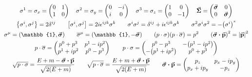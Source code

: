 \begin{gather*}
        \sigma^1 = \sigma_x = \begin{pmatrix}
                0 &1\\
                1 &0
        \end{pmatrix}
        \quad
        \sigma^2 = \sigma_y = \begin{pmatrix}
                0 &-i\\
                i &0
        \end{pmatrix}
        \quad
        \sigma^3 = \sigma_z = \begin{pmatrix}
                1 &0\\
                0 &-1
        \end{pmatrix}
        \quad
        \va*{\Sigma} = \begin{pmatrix}
                \va*{\sigma} &0\\
                0 &\va*{\sigma}\\
        \end{pmatrix}
        \\
        \acomm{\sigma^i}{\sigma^j} = 2\delta^{ij}
        \qquad
        \comm{\sigma^i}{\sigma^j} = 2i\epsilon^{ijk}\sigma^k
        \qquad
        \sigma^i\sigma^j = \delta^{ij} + i\epsilon^{ijk}\sigma^k
        \qquad
        \sigma^2\sigma^i\sigma^2 = -\qty(\sigma^i)^*
        \\
        \sigma^\mu=\qty(\mathbb{1},\va*{\sigma})
        \qquad
        \overline{\sigma}^\mu=\qty(\mathbb{1},-\va*{\sigma})
        \qquad
        \qty(p\cdot\sigma)\qty(p\cdot\overline{\sigma}) = p^2
        \qquad
        \qty(\va*{\sigma}\vdot\va{p})^2 = \abs{\va{p}}^2
        \\
        p\cdot\overline{\sigma} = \begin{pmatrix}
                p^0+p^3  &p^1-ip^2 \\
                p^1+ip^2 &p^0-p^3  \\
        \end{pmatrix}
        \qquad
        p\cdot\sigma = \begin{pmatrix}
                p^0 - p^3       &-\qty(p^1-ip^2) \\
                -\qty(p^1+ip^2) &p^0+p^3         \\
        \end{pmatrix}
        \\
        \sqrt{p\cdot\sigma} = \frac{E + m - \va*{\sigma}\vdot\va{p}}{\sqrt{2(E+m)}}
        \qquad
        \sqrt{p\cdot\overline{\sigma}} = \frac{E + m + \va*{\sigma}\vdot\va{p}}{\sqrt{2(E+m)}}
        \qquad
        \va*{\sigma}\vdot\va{p} = \begin{pmatrix}
                p_z      &p_x-ip_y \\
                p_x+ip_y &-p_z     \\
        \end{pmatrix}
\end{gather*}
